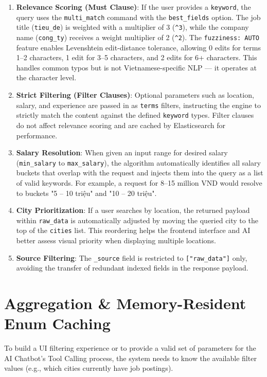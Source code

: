 \begin{enumerate}
\item \textbf{Relevance Scoring (Must Clause)}: If the user provides a \texttt{keyword}, the query uses the \texttt{multi\_match} command with the \texttt{best\_fields} option. The job title (\texttt{tieu\_de}) is weighted with a multiplier of 3 (\texttt{\textasciicircum{}3}), while the company name (\texttt{cong\_ty}) receives a weight multiplier of 2 (\texttt{\textasciicircum{}2}). The \texttt{fuzziness: AUTO} feature enables Levenshtein edit-distance tolerance, allowing 0 edits for terms 1–2 characters, 1 edit for 3–5 characters, and 2 edits for 6+ characters. This handles common typos but is not Vietnamese-specific NLP — it operates at the character level.
\item \textbf{Strict Filtering (Filter Clauses)}: Optional parameters such as location, salary, and experience are passed in as \texttt{terms} filters, instructing the engine to strictly match the content against the defined \texttt{keyword} types. Filter clauses do not affect relevance scoring and are cached by Elasticsearch for performance.
\item \textbf{Salary Resolution}: When given an input range for desired salary (\texttt{min\_salary} to \texttt{max\_salary}), the algorithm automatically identifies all salary buckets that overlap with the request and injects them into the query as a list of valid keywords. For example, a request for 8–15 million VND would resolve to buckets "5 – 10 triệu" and "10 – 20 triệu".
\item \textbf{City Prioritization}: If a user searches by location, the returned payload within \texttt{raw\_data} is automatically adjusted by moving the queried city to the top of the \texttt{cities} list. This reordering helps the frontend interface and AI better assess visual priority when displaying multiple locations.
\item \textbf{Source Filtering}: The \texttt{\_source} field is restricted to \texttt{["raw\_data"]} only, avoiding the transfer of redundant indexed fields in the response payload.
\end{enumerate}

\section{Aggregation \& Memory-Resident Enum Caching}

To build a UI filtering experience or to provide a valid set of parameters for the AI Chatbot's Tool Calling process, the system needs to know the available filter values (e.g., which cities currently have job postings).

